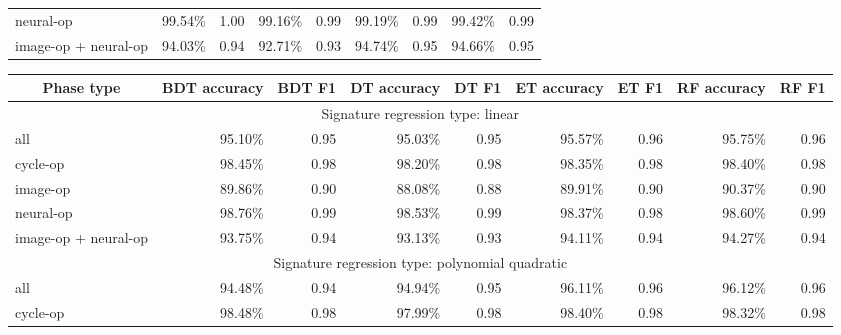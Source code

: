 \begin{table*}[htbp]
\begin{subtable}{\textwidth}
\begin{tabular}{@{}lrrrrrrrr@{}}
            neural-op         		& 99.54\%  & 1.00  & 99.16\%  & 0.99  & 99.19\%  & 0.99  & 99.42\%  & 0.99 \\
            image-op + neural-op 	& 94.03\%  & 0.94  & 92.71\%  & 0.93  & 94.74\%  & 0.95  & 94.66\%  & 0.95 \\
            \bottomrule
        \end{tabular}
    \end{subtable}
    \vspace{1em}
    \begin{subtable}{\textwidth}
        \centering
        \caption{Model performance results for end-cut segmentation, applied to each phase type}
        \label{tab:model_performance_end}
        \begin{tabular}{@{}lrrrrrrrr@{}}
            \toprule
            \multicolumn{1}{c}{\textbf{Phase type}} & 
            \multicolumn{1}{c}{\textbf{BDT accuracy}} & 
            \multicolumn{1}{c}{\textbf{BDT F1}} & 
            \multicolumn{1}{c}{\textbf{DT accuracy}} &
            \multicolumn{1}{c}{\textbf{DT F1}} &
            \multicolumn{1}{c}{\textbf{ET accuracy}} &
            \multicolumn{1}{c}{\textbf{ET F1}} &
            \multicolumn{1}{c}{\textbf{RF accuracy}} &
            \multicolumn{1}{c}{\textbf{RF F1}} \\
            \midrule
            \multicolumn{9}{c}{Signature regression type: linear} \\
	        \midrule
            all               		& 95.10\%  & 0.95  & 95.03\%  & 0.95  & 95.57\%  & 0.96  & 95.75\%  & 0.96 \\
            cycle-op          		& 98.45\%  & 0.98  & 98.20\%  & 0.98  & 98.35\%  & 0.98  & 98.40\%  & 0.98 \\
            image-op          		& 89.86\%  & 0.90  & 88.08\%  & 0.88  & 89.91\%  & 0.90  & 90.37\%  & 0.90 \\
            neural-op         		& 98.76\%  & 0.99  & 98.53\%  & 0.99  & 98.37\%  & 0.98  & 98.60\%  & 0.99 \\
            image-op + neural-op 	& 93.75\%  & 0.94  & 93.13\%  & 0.93  & 94.11\%  & 0.94  & 94.27\%  & 0.94 \\
            \midrule
	        \multicolumn{9}{c}{Signature regression type: polynomial quadratic} \\
	        \midrule
	        all               		& 94.48\%  & 0.94  & 94.94\%  & 0.95  & 96.11\%  & 0.96  & 96.12\%  & 0.96 \\
            cycle-op          		& 98.48\%  & 0.98  & 97.99\%  & 0.98  & 98.40\%  & 0.98  & 98.32\%  & 0.98 \\

\end{tabular}
\end{subtable}
\end{table*}
